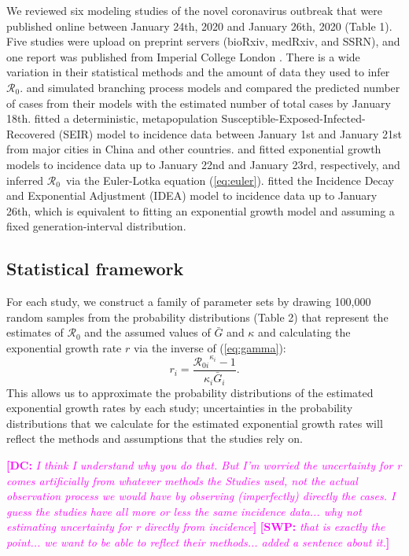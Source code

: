 \documentclass[12pt]{article}
\newcommand{\eref}[1]{(\ref{eq:#1})}
\newcommand{\Rx}[1]{\ensuremath{{\mathcal R}_{#1}}}
\newcommand{\Ro}{\Rx{0}\xspace}
\newcommand{\comment}[3]{\textcolor{#1}{\textbf{[#2: }\textsl{#3}\textbf{]}}}
\newcommand{\swp}[1]{\comment{magenta}{SWP}{#1}}
\newcommand{\dc}[1]{\comment{magenta}{DC}{#1}}
\begin{document}
We reviewed six modeling studies of the novel coronavirus outbreak that were published online between January 24th, 2020 and January 26th, 2020 (Table 1).
Five studies \citep{liuncov, majumderncov, readncov, riouncov, zhaoncov} were upload on preprint servers (bioRxiv, medRxiv, and SSRN), and one report was published from Imperial College London \citep{imaincov}.
There is a wide variation in their statistical methods and the amount of data they used to infer \Ro.
\cite{imaincov} and \cite{riouncov} simulated branching process models and compared the predicted number of cases from their models with the estimated number of total cases by January 18th.
\cite{readncov} fitted a deterministic, metapopulation Susceptible-Exposed-Infected-Recovered (SEIR) model to incidence data between January 1st and January 21st from major cities in China and other countries.
\cite{zhaoncov} and \cite{liuncov} fitted exponential growth models to incidence data up to January 22nd and January 23rd, respectively, and inferred \Ro\ via the Euler-Lotka equation \eref{euler}.
\cite{majumderncov} fitted the Incidence Decay and Exponential Adjustment (IDEA) model \citep{fisman2013idea} to incidence data up to January 26th, which is equivalent to fitting an exponential growth model and assuming a fixed generation-interval distribution.

\subsection{Statistical framework}

For each study, we construct a family of parameter sets by drawing 100,000 random samples from the probability distributions (Table 2) that represent the estimates of \Ro and the assumed values of $\bar G$ and $\kappa$ and calculating the exponential growth rate $r$ via the inverse of \eref{gamma}:
\begin{equation}
r_i = \frac{{\mathcal R_{0i}}^{\kappa_i} - 1}{\kappa_i \bar{G}_i}.
\end{equation}
This allows us to approximate the probability distributions of the estimated exponential growth rates by each study;
uncertainties in the probability distributions that we calculate for the estimated exponential growth rates will reflect the methods and assumptions that the studies rely on.

\dc{I think I understand why you do that. But I’m worried the uncertainty for r comes
artificially from whatever methods the Studies used, not the actual observation process we
would have by observing (imperfectly) directly the cases. I guess the studies have all more or
less the same incidence data... why not estimating uncertainty for r directly from incidence}
\swp{that is exactly the point... we want to be able to reflect their methods... added a sentence about it.}
\end{document}
